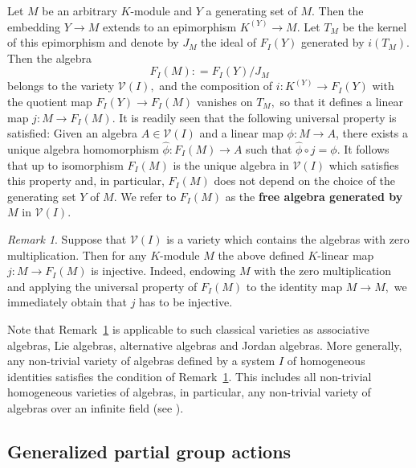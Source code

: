 \documentclass[11pt]{amsart}
\numberwithin{equation}{section}
\theoremstyle{definition}
\theoremstyle{remark}
\newtheorem{remark}[theorem]{Remark}
\begin{document}
Let $ M $ be an arbitrary \( K \)-module and $Y$ a generating set of $M.$ Then the embedding $Y\to M$ extends to an epimorphism $K^{(Y)} \to M.$ Let $T_M$ be the kernel of this epimorphism and denote by $J_M$ the ideal of  $F_I(Y)$ generated by 
 $i (T_M).$  Then the algebra 
 $$F_I(M): = F_I(Y)/ J_M$$
 belongs to the variety $\mathcal{V}(I),$ and the composition of \( i: K^{(Y)} \to F_I(Y) \) with the quotient map $F_I(Y) \to F_I(M)$ vanishes on 
 $T_M,$ so that it defines a linear map \( j: M \to F_I(M) \). It is readily seen that the following universal property is satisfied:
  Given an algebra \( A \in \mathcal{V}(I) \) and a linear map \( \phi: M \to A \), there exists a unique algebra homomorphism \( \widehat{\phi}: F_I(M) \to A \) such that  \( \widehat{\phi} \circ j = \phi \).  It follows that  up to isomorphism  $F_I(M)$ is  the unique  algebra in $\mathcal{V}(I)$ which satisfies this property   and, in particular, 
  $F_I(M)$ does not depend on the choice of the generating set $Y$ of $M.$
 We refer to \( F_I(M) \) as the \textbf{free algebra generated by \( M \)} in \( \mathcal{V}(I) \). 
 
 \begin{remark}\label{rem:injective_j} Suppose that  $\mathcal{V}(I)$ is a variety which contains the algebras with zero multiplication. Then for any $K$-module $M$ the above defined $K$-linear map $j: M \to F_I(M)$ is injective. Indeed, endowing $M$ with the zero multiplication and applying the universal property of $F_I(M)$ to the identity map $M\to M,$ we immediately obtain that $j$ has to be  injective.
 \end{remark}
 
 Note that Remark~\ref{rem:injective_j} is applicable to such classical varieties as associative algebras, Lie algebras, alternative algebras and Jordan algebras. More generally,  any non-trivial variety of algebras  defined by a system $I$ of 
homogeneous identities satisfies the condition of Remark~\ref{rem:injective_j}. This includes all non-trivial homogeneous varieties of algebras, in particular,  any non-trivial variety of algebras over an infinite  field (see \cite[p.8]{Book_Zhevlakov-Slinko-Shestakov-Shirshov_1982_RTNAR}).
 


\subsection{Generalized partial group actions}\label{Generalized partial group actions}
\end{document}
